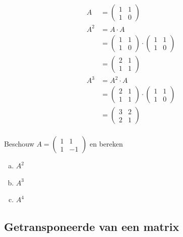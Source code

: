 \documentclass[12pt,twoside]{article}
\begin{document}
\begin{align*}
  A &= \begin{pmatrix}1 & 1\\ 1 & 0\end{pmatrix}\\
  A^2 &= A \cdot A\\
    &= \begin{pmatrix}1 & 1\\ 1 & 0\end{pmatrix} \cdot \begin{pmatrix}1 & 1\\ 1 & 0\end{pmatrix}\\
    &= \begin{pmatrix}2 & 1\\ 1 & 1\end{pmatrix}\\
  A^3 &= A^2 \cdot A\\
    &= \begin{pmatrix}2 & 1\\ 1 & 1\end{pmatrix} \cdot \begin{pmatrix}1 & 1\\ 1 & 0\end{pmatrix}\\
    &= \begin{pmatrix}3 & 2\\ 2 & 1\end{pmatrix}\\
\end{align*}

\begin{oefening}
Beschouw $A=\begin{pmatrix}1 & 1\\ 1 & -1\end{pmatrix}$ en bereken
\begin{multicols}{3}
\begin{enumerate}[(a)]
\item $A^2$
\item $A^3$
\item $A^4$
\end{enumerate}
\end{multicols}
\end{oefening}

\subsection{Getransponeerde van een matrix}
\end{document}
